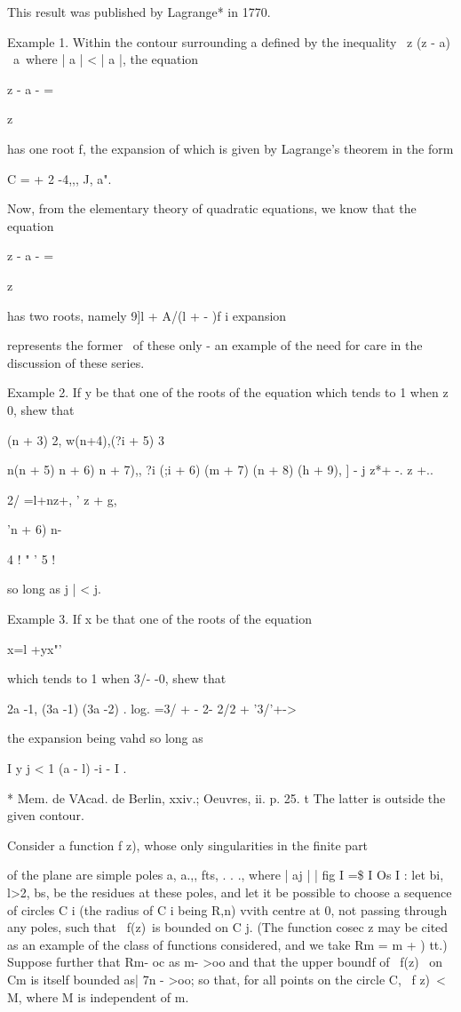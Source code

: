 This result was published by Lagrange* in 1770.

Example 1. Within the contour surrounding a defined by the inequality
\ z (z - a) \ a\, where | a | < | a |, the equation

z - a - =

z

has one root f, the expansion of which is given by Lagrange's theorem
in the form

C = + 2 -4,,, J, a".

Now, from the elementary theory of quadratic equations, we know that
the equation

z - a - =

z

has two roots, namely 9]l + A/(l + - )f i %
expansion

represents the former \ of these only - an example of the need for
care in the discussion of these series.

Example 2. If y be that one of the roots of the equation which tends
to 1 when z~ 0, shew that

 (n + 3) 2, w(n+4),(?i + 5) 3

n(n + 5) n + 6) n + 7),, ?i (;i + 6) (m + 7) (n + 8) (h + 9), ] - j
z*+ -. z +..

2/ =l+nz+, ' z + g,

'n + 6) n-

4 ! " ' 5 !

so long as j | < j.

Example 3. If x be that one of the roots of the equation

x=l +yx"'

which tends to 1 when 3/- -0, shew that

2a -1, (3a -1) (3a -2) . log. =3/ + - 2- 2/2 + '3/'+->

the expansion being vahd so long as

I y j < 1 (a - l) -i - I . 

* Mem. de VAcad. de Berlin, xxiv.; Oeuvres, ii. p. 25. t The latter is
outside the given contour.

%
%


  Consider a function f z), whose only singularities in the finite
part

of the plane are simple poles a, a.,, fts, . . ., where | aj | | fig
I =\$ I Os I   : let bi, l>2, bs,  be the residues at these
poles, and let it be possible to choose a sequence of circles C i (the
radius of C i being R,n) vvith centre at 0, not passing through any
poles, such that \ f(z)\ is bounded on C j. (The function cosec z may
be cited as an example of the class of functions considered, and we
take Rm = m + ) tt.) Suppose further that Rm- oc as m- >oo and that
the upper boundf of \ f(z) \ on Cm is itself bounded as| 7n - >oo; so
that, for all points on the circle C, \ f z)\ < M, where M is
independent of m.

